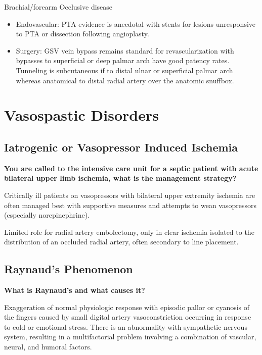 \documentclass[
]{book}
\begin{document}
Brachial/forearm Occlusive disease

\begin{itemize}
\item
  Endovascular: PTA evidence is anecdotal with stents for lesions
  unresponsive to PTA or dissection following angioplasty.\citep{cheun2019, nasser2014, dineen2007}
\item
  Surgery: GSV vein bypass remains standard for revascularization with
  bypasses to superficial or deep palmar arch have good patency rates.
  Tunneling is subcutaneous if to distal ulnar or superficial palmar
  arch whereas anatomical to distal radial artery over the anatomic
  snuffbox.\citep{chang2003, masden2012, spinelli2010}
\end{itemize}

\hypertarget{vasospastic-disorders}{%
\section{Vasospastic Disorders}\label{vasospastic-disorders}}

\hypertarget{iatrogenic-or-vasopressor-induced-ischemia}{%
\subsection{Iatrogenic or Vasopressor Induced Ischemia}\label{iatrogenic-or-vasopressor-induced-ischemia}}

\textbf{You are called to the intensive care unit for a septic patient with
acute bilateral upper limb ischemia, what is the management strategy?}

Critically ill patients on vasopressors with bilateral upper extremity
ischemia are often managed best with supportive measures and attempts to
wean vasopressors (especially norepinephrine).\citep{landry2018}

Limited role for radial artery embolectomy, only in clear ischemia
isolated to the distribution of an occluded radial artery, often
secondary to line placement.\citep{valentine2005}

\hypertarget{raynauds-phenomenon}{%
\subsection{Raynaud's Phenomenon}\label{raynauds-phenomenon}}

\textbf{What is Raynaud's and what causes it?} \citep{shuja117UpperExtremity, landry141RaynaudPhenomenon2019}

Exaggeration of normal physiologic response with episodic pallor or
cyanosis of the fingers caused by small digital artery vasoconstriction
occurring in response to cold or emotional stress. There is an
abnormality with sympathetic nervous system, resulting in a
multifactorial problem involving a combination of vascular, neural, and
humoral factors.
\end{document}
